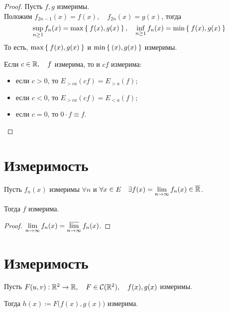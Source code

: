 \begin{proof}
	Пусть $ f, g $ измеримы. \\
	Положим $ f_{2n - 1}(x) = f(x), \quad f_{2n}(x) = g(x) $, тогда
	$$ \sup\limits_{n \ge 1} f_n(x) = \max \Set{f(x), g(x)}, \quad \inf\limits_{n \ge 1} f_n(x) = \min \Set{f(x), g(x)} $$
	То есть, $ \max\Set{f(x), g(x)} $ и $ \min \Set{(x), g(x)} $ измеримы.

	Если $ c \in \mathbb{R}, \quad f $ измерима, то и $ cf $ измерима:
	\begin{itemize}
		\item если $ c > 0 $, то $ E_{>ca}(cf) = E_{>a}(f) $;
		\item если $ c < 0 $, то $ E_{>ca}(cf) = E_{<a}(f) $;
		\item если $ c = 0 $, то $ 0 \cdot f \equiv f $.
	\end{itemize}
\end{proof}

\section{Измеримость }

\begin{property}
	Пусть $ f_n(x) $ измеримы $ \forall n $ и $ \forall x \in E \quad \exists f(x) = \lim\limits_{n \to \infty} f_n(x) \in \overline {\mathbb{R}} $.

	Тогда $ f $ измерима.
\end{property}

\begin{proof}
	$ \lim\limits_{n \to \infty} f_n(x) = \varlimsup\limits_{n \to \infty} f_n(x) $.
\end{proof}

\section{Измеримость }

\begin{property}
	Пусть $ F(u, v) : \mathbb{R}^2 \to \mathbb{R}, \quad F \in \mathcal C(\mathbb{R}^2), \quad f(x), g(x) $ измеримы.

	Тогда $ h(x) \coloneq F \bigl( f(x), g(x) \bigr) $ измерима.
\end{property}

